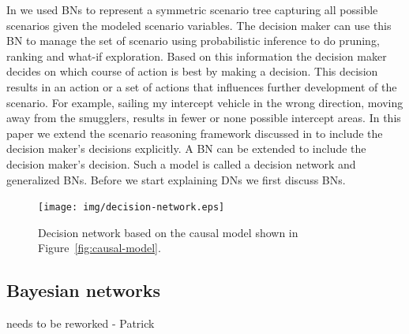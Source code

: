 \documentclass[conference]{IEEEtran}
\begin{document}
In \cite{conrado14if} we used BNs to represent a symmetric scenario tree capturing all possible scenarios given the modeled scenario variables. The decision maker can use this BN to manage the set of scenario using probabilistic inference to do pruning, ranking and what-if exploration. Based on this information the decision maker decides on which course of action is best by making a decision. This decision results in an action or a set of actions that influences further development of the scenario. For example, sailing my intercept vehicle in the wrong direction, moving away from the smugglers, results in fewer or none possible intercept areas. In this paper we extend the scenario reasoning framework discussed in \cite{conrado14if} to include the decision maker's decisions explicitly. A BN can be extended to include the decision maker's decision. Such a model is called a decision network and generalized BNs. Before we start explaining DNs we first discuss BNs.


\begin{figure}
\begin{center}
 \texttt{[image: img/decision-network.eps]}
 \caption{Decision network based on the causal model shown in Figure~\ref{fig:causal-model}.\label{fig:decision-graph}}
\end{center}
\end{figure}


\subsection{Bayesian networks}\label{sec:bayesian-networks}

{\red needs to be reworked - Patrick}
\end{document}
